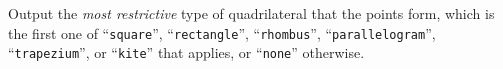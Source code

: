 \begin{Output}
    Output the \emph{most restrictive} type of quadrilateral that the points
    form, which is the first one of
    ``\texttt{square}'', ``\texttt{rectangle}'', ``\texttt{rhombus}'',
    ``\texttt{parallelogram}'', ``\texttt{trapezium}'', or ``\texttt{kite}'' that
    applies, or ``\texttt{none}'' otherwise.
\end{Output}

